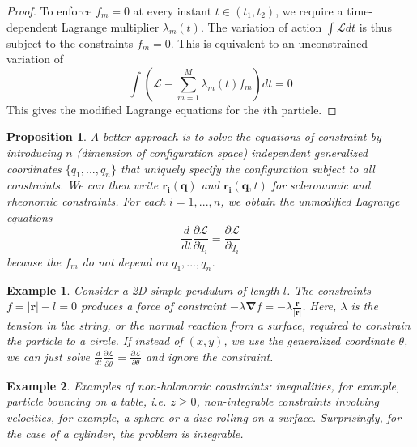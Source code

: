 \documentclass[a4paper]{article}
\newtheorem{eg}{Example}[section]
\newtheorem{prop}{Proposition}[section]
\theoremstyle{new}
\begin{document}
\begin{proof}
To enforce $f_m=0$ at every instant $t\in(t_1,t_2)$, we require a time-dependent Lagrange multiplier $\lambda_m(t)$. The variation of action $\int\mathcal{L}dt$ is thus subject to the constraints $f_m=0$. This is equivalent to an unconstrained variation of 
$$\int(\mathcal{L}-\sum_{m=1}^M\lambda_m(t)f_m)dt=0$$
This gives the modified Lagrange equations for the $i$th particle. 
\end{proof}
\begin{prop}
A better approach is to solve the equations of constraint by introducing $n$ (dimension of configuration space) independent generalized coordinates $\{q_1,...,q_n\}$ that uniquely specify the configuration subject to all constraints. We can then write $\mathbf{r_i}(\mathbf{q})$ and $\mathbf{r_i}(\mathbf{q},t)$ for scleronomic and rheonomic constraints. For each $i=1,...,n$, we obtain the unmodified Lagrange equations
$$\frac{d}{dt}\frac{\partial\mathcal{L}}{\partial\dot{q}_i}=\frac{\partial\mathcal{L}}{\partial q_i}$$
because the $f_m$ do not depend on $q_1,...,q_n$.
\end{prop}
\begin{eg}
Consider a 2D simple pendulum of length $l$. The constraints $f=|\mathbf{r}|-l=0$ produces a force of constraint $-\lambda\boldsymbol{\nabla}f=-\lambda\frac{\mathbf{r}}{|\mathbf{r}|}$. Here, $\lambda$ is the tension in the string, or the normal reaction from a surface, required to constrain the particle to a circle. If instead of $(x,y)$, we use the generalized coordinate $\theta$, we can just solve $\frac{d}{dt}\frac{\partial\mathcal{L}}{\partial\dot{\theta}}=\frac{\partial\mathcal{L}}{\partial\theta}$ and ignore the constraint.
\end{eg}
\begin{eg}
Examples of non-holonomic constraints: inequalities, for example, particle bouncing on a table, i.e. $z\geq0$, non-integrable constraints involving velocities, for example, a sphere or a disc rolling on a surface. Surprisingly, for the case of a cylinder, the problem is integrable.
\end{eg}
\end{document}
